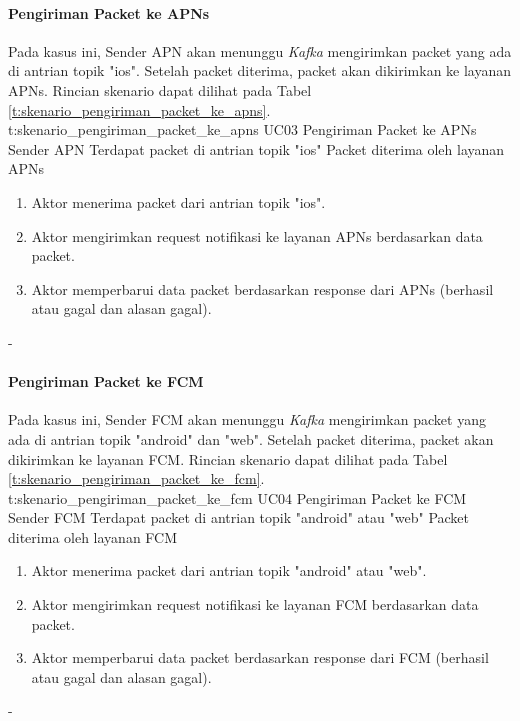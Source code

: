 \paragraph{Pengiriman Packet ke APNs}
\par Pada kasus ini, Sender APN akan menunggu \textit{Kafka} mengirimkan packet yang ada di antrian topik "ios". Setelah packet diterima, packet akan dikirimkan ke layanan APNs. Rincian skenario dapat dilihat pada Tabel \ref{t:skenario_pengiriman_packet_ke_apns}.
\tableUcDesc
{t:skenario_pengiriman_packet_ke_apns}
{UC03}
{Pengiriman Packet ke APNs}
{Sender APN}
{Terdapat packet di antrian topik "ios"}
{Packet diterima oleh layanan APNs}
{
\begin{enumerate}
    \item Aktor menerima packet dari antrian topik "ios".
    \item Aktor mengirimkan request notifikasi ke layanan APNs berdasarkan data packet.
    \item Aktor memperbarui data packet berdasarkan response dari APNs (berhasil atau gagal dan alasan gagal).
\end{enumerate}
}
{-}

\paragraph{Pengiriman Packet ke FCM}
\par Pada kasus ini, Sender FCM akan menunggu \textit{Kafka} mengirimkan packet yang ada di antrian topik "android" dan "web". Setelah packet diterima, packet akan dikirimkan ke layanan FCM. Rincian skenario dapat dilihat pada Tabel \ref{t:skenario_pengiriman_packet_ke_fcm}.
\tableUcDesc
{t:skenario_pengiriman_packet_ke_fcm}
{UC04}
{Pengiriman Packet ke FCM}
{Sender FCM}
{Terdapat packet di antrian topik "android" atau "web"}
{Packet diterima oleh layanan FCM}
{
\begin{enumerate}
    \item Aktor menerima packet dari antrian topik "android" atau "web".
    \item Aktor mengirimkan request notifikasi ke layanan FCM berdasarkan data packet.
    \item Aktor memperbarui data packet berdasarkan response dari FCM (berhasil atau gagal dan alasan gagal).
\end{enumerate}
}
{-}

